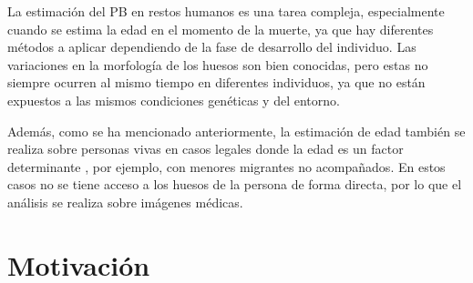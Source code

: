 La estimación del PB en restos humanos es una tarea compleja, especialmente cuando se estima la edad en el 
momento de la muerte, ya que hay diferentes métodos a aplicar dependiendo de la fase de desarrollo del 
individuo. Las variaciones en la morfología de los huesos son bien conocidas, pero estas no siempre ocurren 
al mismo tiempo en diferentes individuos, ya que no están expuestos a las mismos condiciones genéticas y del 
entorno.

Además, como se ha mencionado anteriormente, la estimación de edad también se realiza sobre personas vivas
en casos legales donde la edad es un factor determinante \cite{schmeling2016}, por ejemplo, con menores 
migrantes no acompañados. En estos casos no se tiene acceso a los huesos de la persona de forma directa, por 
lo que el análisis se realiza sobre imágenes médicas.




\section{Motivación}

